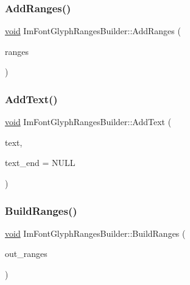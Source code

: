 \subsubsection{\texorpdfstring{Add\+Ranges()}{AddRanges()}}
{\footnotesize\ttfamily \hyperlink{imgui__impl__opengl3__loader_8h_ac668e7cffd9e2e9cfee428b9b2f34fa7}{void} Im\+Font\+Glyph\+Ranges\+Builder\+::\+Add\+Ranges (\begin{DoxyParamCaption}\item[{const Im\+Wchar $\ast$}]{ranges }\end{DoxyParamCaption})}

\mbox{\label{structImFontGlyphRangesBuilder_ade9770bde0f63b4630df30402f3619cf}} 
\subsubsection{\texorpdfstring{Add\+Text()}{AddText()}}
{\footnotesize\ttfamily \hyperlink{imgui__impl__opengl3__loader_8h_ac668e7cffd9e2e9cfee428b9b2f34fa7}{void} Im\+Font\+Glyph\+Ranges\+Builder\+::\+Add\+Text (\begin{DoxyParamCaption}\item[{const char $\ast$}]{text,  }\item[{const char $\ast$}]{text\+\_\+end = {\ttfamily NULL} }\end{DoxyParamCaption})}

\mbox{\label{structImFontGlyphRangesBuilder_abc11a683e1b345299c42abd8b6c422a5}} 
\subsubsection{\texorpdfstring{Build\+Ranges()}{BuildRanges()}}
{\footnotesize\ttfamily \hyperlink{imgui__impl__opengl3__loader_8h_ac668e7cffd9e2e9cfee428b9b2f34fa7}{void} Im\+Font\+Glyph\+Ranges\+Builder\+::\+Build\+Ranges (\begin{DoxyParamCaption}\item[{\hyperlink{structImVector}{Im\+Vector}$<$ Im\+Wchar $>$ $\ast$}]{out\+\_\+ranges }\end{DoxyParamCaption})}


